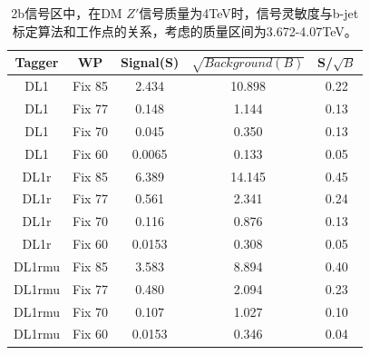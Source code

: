 \begin{table}[ht]
	\begin{center}
		\begin{tabular}{|c|c|c|c|c|}\hline
			Tagger       & WP          & Signal(S)    & $\sqrt{Background(B)}$    & S/$\sqrt{B}$ \\
			\hline
			DL1          & Fix 85      & 2.434      & 10.898        & 0.22        \\
			DL1          & Fix 77      & 0.148      & 1.144         & 0.13        \\
			DL1          & Fix 70      & 0.045      & 0.350         & 0.13        \\
			DL1          & Fix 60      & 0.0065     & 0.133         & 0.05        \\
			\hline
			DL1r          & Fix 85      & 6.389       & 14.145       & 0.45        \\
			DL1r          & Fix 77      & 0.561       & 2.341        & 0.24        \\
			DL1r          & Fix 70      & 0.116       & 0.876        & 0.13        \\
			DL1r          & Fix 60      & 0.0153      & 0.308        & 0.05        \\
			\hline
			DL1rmu          & Fix 85      & 3.583     & 8.894       & 0.40        \\
			DL1rmu          & Fix 77      & 0.480     & 2.094       & 0.23        \\
			DL1rmu          & Fix 70      & 0.107     & 1.027       & 0.10        \\
			DL1rmu          & Fix 60      & 0.0153    & 0.346       & 0.04        \\
			\hline
		\end{tabular}
	\end{center}
	\caption{
	2b信号区中，在DM $Z\prime$信号质量为4TeV时，信号灵敏度与b-jet标定算法和工作点的关系，考虑的质量区间为3.672-4.07TeV。
	}
	\label{tab:SenZ4TeV}
\end{table}

